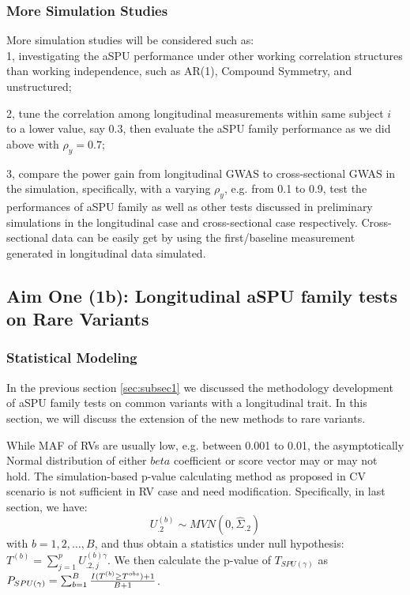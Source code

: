 \documentclass[12pt]{article}
\begin{document}
\subsubsection{More Simulation Studies}\label{sec:subsub1-3}
More simulation studies will be considered such as: \\
1, investigating the aSPU performance under other working correlation structures than working independence, such as AR(1), Compound Symmetry, and unstructured; 

2, tune the correlation among longitudinal measurements within same subject $i$ to a lower value, say 0.3, then evaluate the aSPU family performance as we did above with $\rho_y = 0.7$; 

3, compare the power gain from longitudinal GWAS to cross-sectional GWAS in the simulation, specifically, with a varying $\rho_y$, e.g. from 0.1 to 0.9, test the performances of aSPU family as well as other tests discussed in preliminary simulations in the longitudinal case and cross-sectional case respectively. Cross-sectional data can be easily get by using the first/baseline measurement generated in longitudinal data simulated.


\subsection{Aim One (1b): Longitudinal aSPU family tests on Rare Variants}\label{sec:subsec2}
\subsubsection{Statistical Modeling}\label{sec:subsub2-1}
In the previous section \ref{sec:subsec1} we discussed the methodology development of aSPU family tests on common variants with a longitudinal trait. In this section, we will discuss the extension of the new methods to rare variants.

While MAF of RVs are usually low, e.g. between 0.001 to 0.01, the asymptotically Normal distribution of either $beta$ coefficient or score vector may or may not hold. The simulation-based p-value calculating method as proposed in CV scenario is not sufficient in RV case and need modification. Specifically, in last section, we have:
$$
U_{.2}^{ (b) } \sim MVN \left( 0, \hat{\Sigma}_{.2} \right)
$$
with $b = 1,2,\ldots,B$, and thus obtain a statistics under null hypothesis: $T ^ {(b)} = \sum_{j=1}^p U^{ (b)\gamma }_{.2, j} $. We then calculate the p-value of $T_{ SPU(\gamma) }$ as $P_{ SPU(\gamma) } = \sum_{b=1}^B { I(T^{(b)} \geq T ^ {obs} ) + 1  \over B + 1 } $. 
\end{document}
